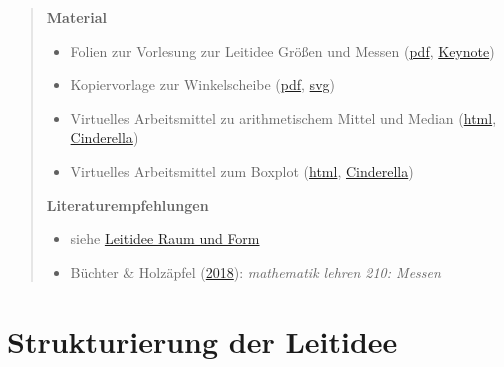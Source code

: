 \documentclass[
]{scrbook}
\providecommand{\tightlist}{%
  \setlength{\itemsep}{0pt}\setlength{\parskip}{0pt}}
\theoremstyle{definition}
\theoremstyle{definition}
\theoremstyle{definition}
\theoremstyle{definition}
\theoremstyle{remark}
\begin{document}
\begin{quote}
\textbf{Material}

\begin{itemize}
\tightlist
\item
  Folien zur Vorlesung zur Leitidee Größen und Messen (\href{files/Stoffdidaktik-WiSe2223-Kap11.pdf}{pdf}, \href{files/Stoffdidaktik-WiSe2223-Kap11.key}{Keynote})
\item
  Kopiervorlage zur Winkelscheibe (\href{files/Stoffdidaktik-WiSe2223-Kap11-Winkelscheibe.pdf}{pdf}, \href{files/Stoffdidaktik-WiSe2223-Kap11-Winkelscheibe.svg}{svg})
\item
  Virtuelles Arbeitsmittel zu arithmetischem Mittel und Median (\href{files/Stoffdidaktik-WiSe2223-Kap11-Lagemasse.html}{html}, \href{files/Stoffdidaktik-WiSe2223-Kap11-Lagemasse.cdy}{Cinderella})
\item
  Virtuelles Arbeitsmittel zum Boxplot (\href{files/Stoffdidaktik-WiSe2223-Kap11-Boxplot.html}{html}, \href{files/Stoffdidaktik-WiSe2223-Kap11-Boxplot.cdy}{Cinderella})
\end{itemize}

\textbf{Literaturempfehlungen}

\begin{itemize}
\tightlist
\item
  siehe \protect\hyperlink{leitidee-raum-und-form}{Leitidee Raum und Form}\\
\item
  Büchter \& Holzäpfel (\protect\hyperlink{ref-Buchter2018}{2018}): \emph{mathematik lehren 210: Messen}
\end{itemize}
\end{quote}

\hypertarget{strukturierung-der-leitidee-groessen-und-messen}{%
\section{Strukturierung der Leitidee}\label{strukturierung-der-leitidee-groessen-und-messen}}
\end{document}
